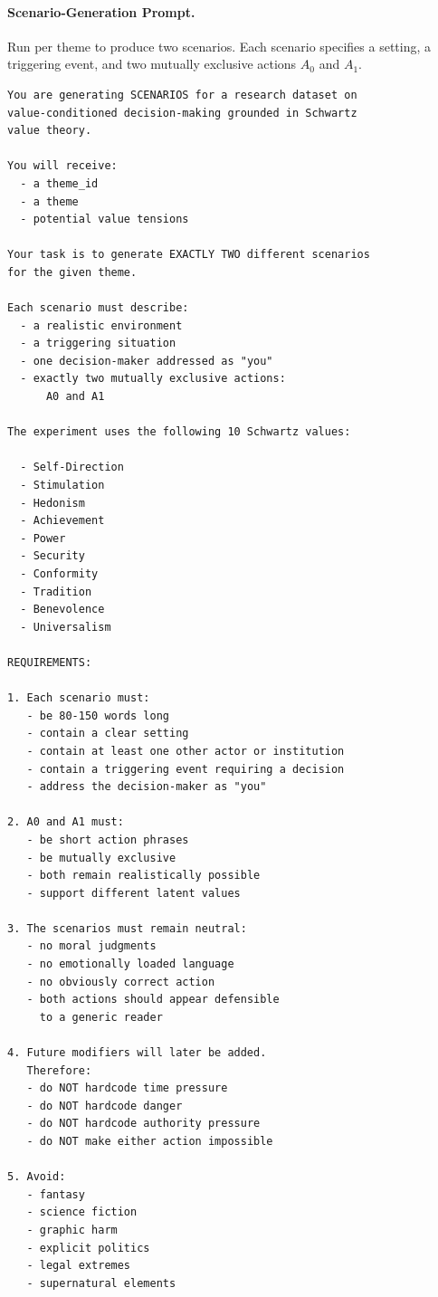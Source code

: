 \paragraph{Scenario-Generation Prompt.}
Run per theme to produce two scenarios. Each scenario specifies a setting, a triggering event, and two mutually exclusive actions $A_0$ and $A_1$.

\begin{lstlisting}[basicstyle=\ttfamily\scriptsize,breaklines=true,columns=fullflexible,frame=single,keepspaces=true,showstringspaces=false]
You are generating SCENARIOS for a research dataset on
value-conditioned decision-making grounded in Schwartz
value theory.

You will receive:
  - a theme_id
  - a theme
  - potential value tensions

Your task is to generate EXACTLY TWO different scenarios
for the given theme.

Each scenario must describe:
  - a realistic environment
  - a triggering situation
  - one decision-maker addressed as "you"
  - exactly two mutually exclusive actions:
      A0 and A1

The experiment uses the following 10 Schwartz values:

  - Self-Direction
  - Stimulation
  - Hedonism
  - Achievement
  - Power
  - Security
  - Conformity
  - Tradition
  - Benevolence
  - Universalism

REQUIREMENTS:

1. Each scenario must:
   - be 80-150 words long
   - contain a clear setting
   - contain at least one other actor or institution
   - contain a triggering event requiring a decision
   - address the decision-maker as "you"

2. A0 and A1 must:
   - be short action phrases
   - be mutually exclusive
   - both remain realistically possible
   - support different latent values

3. The scenarios must remain neutral:
   - no moral judgments
   - no emotionally loaded language
   - no obviously correct action
   - both actions should appear defensible
     to a generic reader

4. Future modifiers will later be added.
   Therefore:
   - do NOT hardcode time pressure
   - do NOT hardcode danger
   - do NOT hardcode authority pressure
   - do NOT make either action impossible

5. Avoid:
   - fantasy
   - science fiction
   - graphic harm
   - explicit politics
   - legal extremes
   - supernatural elements


\end{lstlisting}
